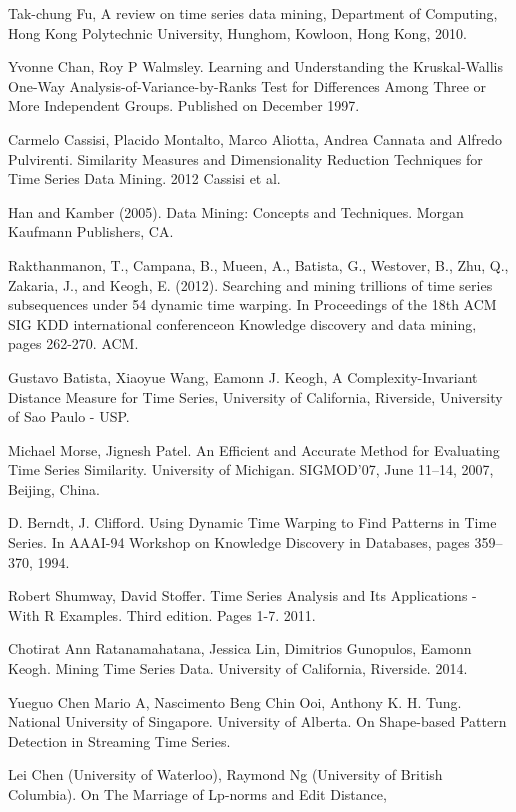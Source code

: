 \begin{thebibliography}{9}
Tak-chung Fu, A review on time series data mining, Department of Computing, Hong Kong Polytechnic University, Hunghom, Kowloon, Hong Kong, 2010.

Yvonne Chan, Roy P Walmsley. Learning and Understanding the Kruskal-Wallis One-Way Analysis-of-Variance-by-Ranks Test for Differences Among Three or More Independent Groups. Published on December 1997.

Carmelo Cassisi, Placido Montalto, Marco Aliotta, Andrea Cannata and Alfredo Pulvirenti. Similarity Measures
and Dimensionality Reduction Techniques for Time Series Data Mining. 2012 Cassisi et al.

Han and Kamber (2005). Data Mining: Concepts and Techniques. Morgan Kaufmann
Publishers, CA.

Rakthanmanon, T., Campana, B., Mueen, A., Batista, G., Westover, B., Zhu, Q., Zakaria, J., and Keogh, E. (2012). Searching and mining trillions of time series subsequences under 54 dynamic time warping. In Proceedings of the 18th ACM SIG KDD international conferenceon Knowledge discovery and data mining, pages 262-270. ACM.

Gustavo Batista, Xiaoyue Wang, Eamonn J. Keogh, A Complexity-Invariant Distance Measure for Time Series, University of California, Riverside, University of Sao Paulo - USP.

Michael Morse, Jignesh Patel. An Efficient and Accurate Method for Evaluating Time Series Similarity. University of Michigan. SIGMOD’07, June 11–14, 2007, Beijing, China.

D. Berndt, J. Clifford. Using Dynamic Time Warping to Find Patterns in Time Series. In AAAI-94 Workshop on Knowledge Discovery in Databases, pages 359–370, 1994.

Robert Shumway, David Stoffer. Time Series Analysis and Its Applications - With R Examples. Third edition. Pages 1-7. 2011.

Chotirat Ann Ratanamahatana, Jessica Lin, Dimitrios Gunopulos, Eamonn Keogh. Mining Time Series Data. University of California, Riverside. 2014.

Yueguo Chen Mario A, Nascimento Beng Chin Ooi, Anthony K. H. Tung. National University of Singapore. University of Alberta. On Shape-based Pattern Detection in Streaming Time Series.


Lei Chen (University of Waterloo), Raymond Ng (University of British Columbia). On The Marriage of Lp-norms and Edit Distance,







\end{thebibliography}